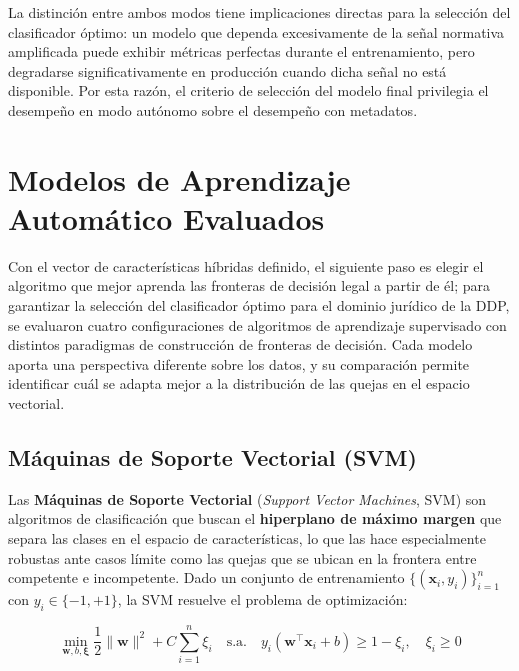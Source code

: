 La distinción entre ambos modos tiene implicaciones directas para la selección
del clasificador óptimo: un modelo que dependa excesivamente de la señal
normativa amplificada puede exhibir métricas perfectas durante el entrenamiento,
pero degradarse significativamente en producción cuando dicha señal no está
disponible. Por esta razón, el criterio de selección del modelo final privilegia
el desempeño en modo autónomo sobre el desempeño con metadatos.

\section{Modelos de Aprendizaje Automático Evaluados}

Con el vector de características híbridas definido, el siguiente paso es elegir
el algoritmo que mejor aprenda las fronteras de decisión legal a partir de él;
para garantizar la selección del clasificador óptimo para el dominio jurídico de
la DDP, se evaluaron cuatro configuraciones de algoritmos de aprendizaje
supervisado con distintos paradigmas de construcción de fronteras de decisión.
Cada modelo aporta una perspectiva diferente sobre los datos, y su comparación
permite identificar cuál se adapta mejor a la distribución de las quejas en el
espacio vectorial.

\subsection{Máquinas de Soporte Vectorial (SVM)}

Las \textbf{Máquinas de Soporte Vectorial} (\textit{Support Vector Machines},
SVM) son algoritmos de clasificación que buscan el \textbf{hiperplano de máximo
margen} que separa las clases en el espacio de características, lo que las hace
especialmente robustas ante casos límite como las quejas que se ubican en la
frontera entre competente e incompetente. \cite{cortes1995} Dado un conjunto de
entrenamiento $\{(\mathbf{x}_i, y_i)\}_{i=1}^n$ con $y_i \in \{-1, +1\}$, la
SVM resuelve el problema de optimización:

\begin{equation}
  \min_{\mathbf{w}, b, \boldsymbol{\xi}}
  \frac{1}{2}\|\mathbf{w}\|^2 + C \sum_{i=1}^n \xi_i
  \quad \text{s.a.} \quad
  y_i(\mathbf{w}^\top \mathbf{x}_i + b) \geq 1 - \xi_i, \quad \xi_i \geq 0
  \label{eq:svm}
\end{equation}

